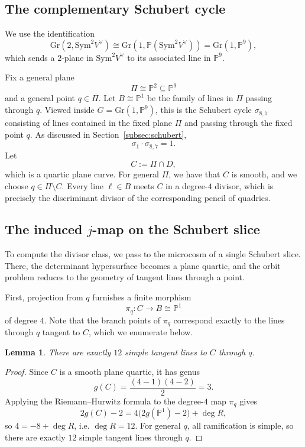 \documentclass[11pt]{article}
\newtheorem{lemma}[theorem]{Lemma}
\newcommand{\G}{\mathrm{Gr}}
\newcommand{\Pj}{\mathbb P}
\newcommand{\Sym}{\mathrm{Sym}}
\begin{document}
\subsection{The complementary Schubert cycle}

We use the identification
\[
\G(2,\Sym^2V^\vee)\cong \G(1,\Pj(\Sym^2V^\vee))=\G(1,\Pj^9),
\]
which sends a $2$-plane in $\Sym^2V^\vee$ to its associated line in $\Pj^9$.

Fix a general plane
\[
\Pi\cong \Pj^2\subseteq \Pj^9
\]
and a general point $q\in \Pi$. Let $B\cong \Pj^1$ be the family of lines in $\Pi$ passing through $q$. Viewed inside $G=\G(1,\Pj^9)$, this is the Schubert cycle $\sigma_{8,7}$ consisting of lines contained in the fixed plane $\Pi$ and passing through the fixed point $q$. As discussed in Section~\ref{subsec:schubert},
\[
\sigma_1\cdot \sigma_{8,7}=1.
\]
Let
\[
C:=\Pi\cap D,
\]
which is a quartic plane curve. For general $\Pi$, we have that $C$ is smooth, and we choose $q\in \Pi\setminus C$. Every line $\ell\in B$ meets $C$ in a degree-$4$ divisor, which is precisely the discriminant divisor of the corresponding pencil of quadrics.

\subsection{The induced \texorpdfstring{$j$}{j}-map on the Schubert slice}

To compute the divisor class, we pass to the microcosm of a single Schubert slice. There, the determinant hypersurface becomes a plane quartic, and the orbit problem reduces to the geometry of tangent lines through a point. 

First, projection from $q$ furnishes a finite morphism
\[
\pi_q\colon C\to B\cong \Pj^1
\]
of degree $4$. Note that the branch points of $\pi_q$ correspond exactly to the lines through $q$ tangent to $C$, which we enumerate below. 

\begin{lemma}\label{lem:12-tangents}
There are exactly $12$ simple tangent lines to $C$ through $q$.
\end{lemma}

\begin{proof}
Since $C$ is a smooth plane quartic, it has genus $$g(C) = \dfrac{(4-1)(4-2)}{2} = 3. $$ Applying the Riemann--Hurwitz formula to the degree-$4$ map $\pi_q$ gives
\[
2g(C)-2 = 4\bigl(2g(\Pj^1)-2\bigr)+\deg R,
\]
so $4 = -8 + \deg R$, i.e. $\deg R = 12$.  
For general $q$, all ramification is simple, so there are exactly $12$ simple tangent lines through $q$.
\end{proof}
\end{document}
